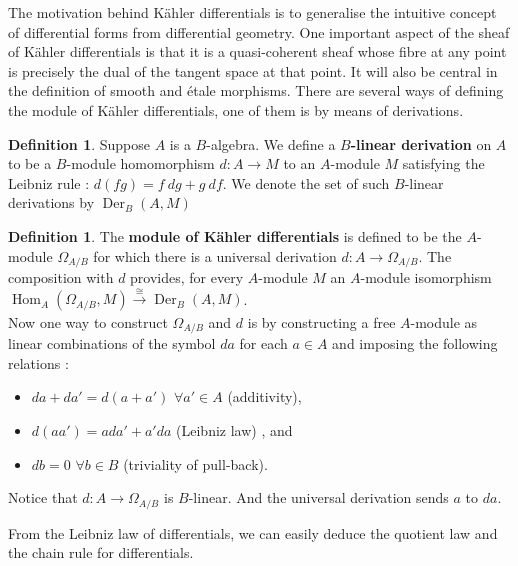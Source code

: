 \documentclass{article}
\theoremstyle{plain}
\theoremstyle{definition}
\newtheorem{definition}[theorem]{Definition}
\DeclareMathOperator{\Hom}{Hom}
\DeclareMathOperator{\Der}{Der}
\begin{document}
The motivation behind K\"ahler differentials is to generalise the intuitive concept of differential forms from differential geometry. 
One important aspect of the sheaf of K\"ahler differentials is that it is a quasi-coherent sheaf whose fibre at any point is precisely the dual of the tangent space at that point. 
It will also be central in the definition of smooth and \'etale morphisms. 
There are several ways of defining the module of K\"ahler differentials, 
one of them is by means of derivations. 

\begin{definition}
    Suppose $A$ is a $B$-algebra.
    We define a \textbf{$B$-linear derivation} on $A$ to be a $B$-module homomorphism $d:A \rightarrow M$ to an $A$-module $M$ satisfying the Leibniz rule : $d(fg) = f\:dg + g\:df$. 
    We denote the set of such $B$-linear derivations by $\Der_B(A,M)$
\end{definition}

\begin{definition}
    The \textbf{module of K\"ahler differentials} is defined to be the $A$-module $\Omega_{A/B}$ for which there is a universal derivation $d:A\rightarrow \Omega_{A/B}$. 
    The composition with $d$ provides, for every $A$-module $M$ an $A$-module isomorphism $\Hom_A(\Omega_{A/B}, M) \xrightarrow[]{\cong} \Der_B(A,M)$.\\
    Now one way to construct $\Omega_{A/B}$ and $d$ is by constructing a free $A$-module as linear combinations of the symbol $da$ for each $a\in A$ and imposing the following relations :
    \begin{itemize}
        \item  $da+da' = d(a+a')$ $\forall a'\in A$ (additivity),
        \item $d(aa') = ada' +a'da$ (Leibniz law) , and
        \item  $db = 0$ $\forall b\in B$ (triviality of pull-back).
    \end{itemize}
    Notice that $d:A\rightarrow\Omega_{A/B}$ is $B$-linear. And the universal derivation sends $a$ to $da$.
\end{definition}


\noindent From the Leibniz law of differentials, we can easily deduce the quotient law and the chain rule for differentials.
\end{document}
